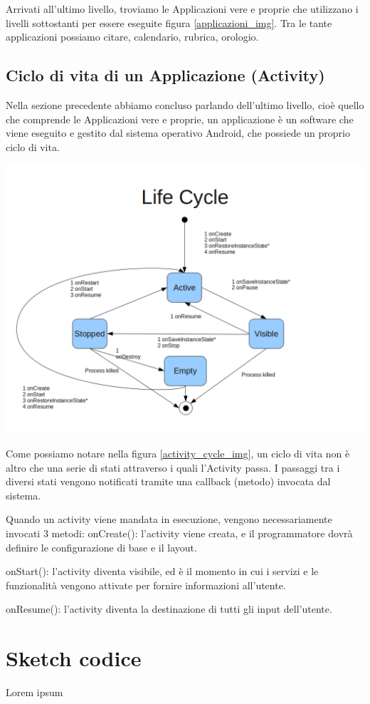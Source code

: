 Arrivati all'ultimo livello, troviamo le Applicazioni vere e proprie che utilizzano i livelli sottostanti per essere eseguite figura \ref{applicazioni_img}.
Tra le tante applicazioni possiamo citare, calendario, rubrica, orologio.

\subsection{Ciclo di vita di un Applicazione (Activity)}

Nella sezione precedente abbiamo concluso parlando dell'ultimo livello, cioè quello che comprende le Applicazioni vere e proprie, un applicazione
è un software che viene eseguito e gestito dal sistema operativo Android, che possiede un proprio ciclo di vita.


\begin{center}
\includegraphics[width=1\textwidth]{imgs/ActivityLifeCycle.jpg}
\label{activity_cycle_img}%
\end{center}

Come possiamo notare nella figura \ref{activity_cycle_img}, un ciclo di vita non è altro che una serie di stati attraverso i quali l'Activity passa.
I passaggi tra i diversi stati vengono notificati tramite una callback (metodo) invocata dal sistema.

Quando un activity viene mandata in esecuzione, vengono necessariamente invocati 3 metodi:
onCreate(): l'activity viene creata, e il programmatore dovrà definire le configurazione di base e il layout.

onStart(): l'activity diventa visibile, ed è il momento in cui i servizi e le funzionalità vengono attivate per fornire informazioni all'utente.

onResume(): l'activity diventa la destinazione di tutti gli input dell'utente.



\section{Sketch codice}
Lorem ipsum

\clearpage{\pagestyle{empty}\cleardoublepage}